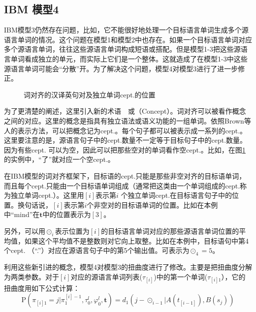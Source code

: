 
\subsection{IBM 模型4}

\parinterval IBM模型3仍然存在问题，比如，它不能很好地处理一个目标语言单词生成多个源语言单词的情况。这个问题在模型1和模型2中也存在。如果一个目标语言单词对应多个源语言单词，往往这些源语言单词构成短语或搭配。但是模型1-3把这些源语言单词看成独立的单元，而实际上它们是一个整体。这就造成了在模型1-3中这些源语言单词可能会``分散''开。为了解决这个问题，模型4对模型3进行了进一步修正。

\begin{figure}[htp]
    \centering

   \caption{词对齐的汉译英句对及独立单词cept.的位置}
   \label{fig:3-32}
\end{figure}

\parinterval 为了更清楚的阐述，这里引入新的术语\ \dash \ {\small{}}或{\small{}}（Concept）。词对齐可以被看作概念之间的对应。这里的概念是指具有独立语法或语义功能的一组单词。依照Brown等人的表示方法\cite{Peter1993The}，可以把概念记为cept.。每个句子都可以被表示成一系列的cept.。这里要注意的是，源语言句子中的cept.数量不一定等于目标句子中的cept.数量。因为有些cept. 可以为空，因此可以把那些空对的单词看作空cept.。比如，在图\ref{fig:3-32}的实例中，``了''就对应一个空cept.。

\parinterval 在IBM模型的词对齐框架下，目标语的cept.只能是那些非空对齐的目标语单词，而且每个cept.只能由一个目标语单词组成（通常把这类由一个单词组成的cept.称为独立单词cept.）。这里用$[i]$表示第$i$ 个独立单词cept.在目标语言句子中的位置。换句话说，$[i]$表示第$i$个非空对的目标语单词的位置。比如在本例中``mind''在$\mathbf{t}$中的位置表示为$[3]$。

\parinterval 另外，可以用$\odot_{i}$表示位置为$[i]$的目标语言单词对应的那些源语言单词位置的平均值，如果这个平均值不是整数则对它向上取整。比如在本例中，目标语句中第4个cept. （``.''）对应在源语言句子中的第5个输出值。可表示为${\odot}_{4}=5$。

\parinterval 利用这些新引进的概念，模型4对模型3的扭曲度进行了修改。主要是把扭曲度分解为两类参数。对于$[i]$对应的源语言单词列表($\tau_{[i]}$)中的第一个单词($\tau_{[i]1}$），它的扭曲度用如下公式计算：
\begin{equation}
\textrm{P}(\pi_{[i]1}=j|{\pi}_1^{[i]-1},{\tau}_0^l,{\varphi}_0^l,\mathbf{t})=d_{1}(j-{\odot}_{i-1}|A(t_{[i-1]}),B(s_j))
\label{eq:3-70}
\end{equation}

